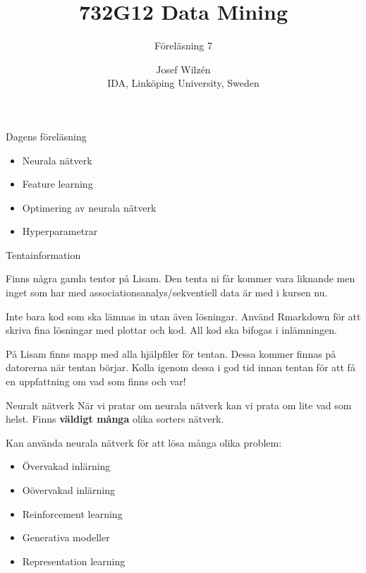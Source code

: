 \documentclass[10pt,english]{beamer}
\title{732G12 Data Mining}
\subtitle{Föreläsning 7}
\date{}
\author{Josef Wilzén \\ IDA, Linköping University, Sweden}
\begin{document}
\maketitle

\begin{frame}{Dagens föreläsning}

    \begin{itemize}
        \item Neurala nätverk
        \item Feature learning
        \item Optimering av neurala nätverk
        \item Hyperparametrar
    \end{itemize}
    
\end{frame}

\begin{frame}{Tentainformation}
    
    Finns några gamla tentor på Lisam. Den tenta ni får kommer vara liknande men inget som har med associationsanalys/sekventiell data är med i kursen nu.

    Inte bara kod som ska lämnas in utan även lösningar. Använd Rmarkdown för att skriva fina lösningar med plottar och kod. All kod ska bifogas i inlämningen.

    På Lisam finns mapp med alla hjälpfiler för tentan. Dessa kommer finnas på datorerna när tentan börjar. Kolla igenom dessa i god tid innan tentan för att få en uppfattning om vad som finns och var!

\end{frame}

\begin{frame}{Neuralt nätverk}
    När vi pratar om neurala nätverk kan vi prata om lite vad som helst. Finns \textbf{väldigt många} olika sorters nätverk.

    Kan använda neurala nätverk för att lösa många olika problem:
    \begin{itemize}
        \item Övervakad inlärning
        \item Oövervakad inlärning
        \item Reinforcement learning
        \item Generativa modeller
        \item Representation learning
    \end{itemize}

\end{frame}
\end{document}
